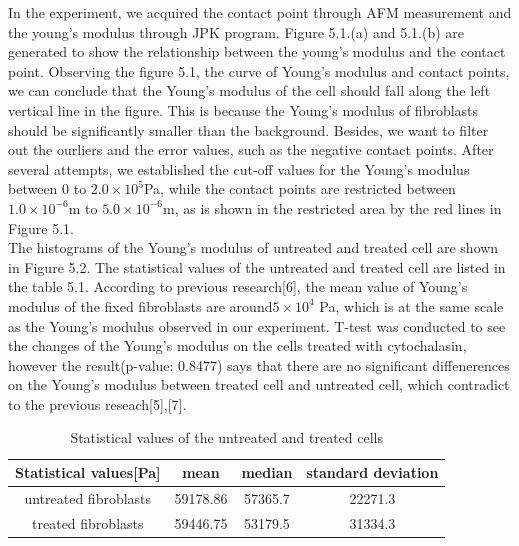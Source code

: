 \documentclass[a4paper,english,12pt,bibliography=totoc]{scrreprt}
\begin{document}
In the experiment, we acquired the contact point through AFM measurement and the young's modulus through JPK program. Figure 5.1.(a) and 5.1.(b) are generated to show the relationship between the young's modulus and the contact point. Observing the figure 5.1, the curve of Young's modulus and contact points, we can conclude that the Young's modulus of the cell should fall along the left vertical line in the figure. This is because the Young's modulus of fibroblasts should be significantly smaller than the background. Besides, we want to filter out the ourliers and the error values, such as the negative contact points. After several attempts, we established the cut-off values for the Young's modulus between 0 to \(2.0 \times 10^{5}\)Pa, while the contact points are restricted between \(1.0 \times 10^{-6}\)m to \(5.0 \times 10^{-6}\)m, as is shown in the restricted area by the red lines in Figure 5.1.\\

The histograms of the Young's modulus of untreated and treated cell are shown in Figure 5.2. The statistical values of the untreated and treated cell are listed in the table 5.1. According to previous research[6], the mean value of Young's modulus of the fixed fibroblasts are around\(5 \times 10^{4}\) Pa, which is at the same scale as the Young's modulus observed in our experiment. T-test was conducted to see the changes of the Young's modulus on the cells treated with cytochalasin, however the result(p-value: 0.8477) says that there are no significant diffenerences on the Young's modulus between treated cell and untreated cell, which contradict to the previous reseach[5],[7].
\begin{table}[h]
\centering
\begin{tabular}{|c|c|c|c|}
  \hline
  Statistical values[Pa] & mean & median & standard deviation\\
  \hline
   untreated fibroblasts & 59178.86 & 57365.7 & 22271.3 \\
    \hline
  treated fibroblasts & 59446.75 & 53179.5 & 31334.3\\
    \hline
\end{tabular}
\caption{Statistical values of the untreated and treated cells}
\label{tab:Statistical_values}
\end{table}

\end{document}
